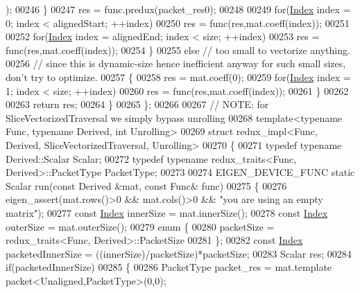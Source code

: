 \begin{DoxyCode}
      );
00246       \}
00247       res = func.predux(packet\_res0);
00248 
00249       \textcolor{keywordflow}{for}(\hyperlink{namespace_eigen_a62e77e0933482dafde8fe197d9a2cfde}{Index} index = 0; index < alignedStart; ++index)
00250         res = func(res,mat.coeff(index));
00251 
00252       \textcolor{keywordflow}{for}(\hyperlink{namespace_eigen_a62e77e0933482dafde8fe197d9a2cfde}{Index} index = alignedEnd; index < size; ++index)
00253         res = func(res,mat.coeff(index));
00254     \}
00255     \textcolor{keywordflow}{else} \textcolor{comment}{// too small to vectorize anything.}
00256          \textcolor{comment}{// since this is dynamic-size hence inefficient anyway for such small sizes, don't try to
       optimize.}
00257     \{
00258       res = mat.coeff(0);
00259       \textcolor{keywordflow}{for}(\hyperlink{namespace_eigen_a62e77e0933482dafde8fe197d9a2cfde}{Index} index = 1; index < size; ++index)
00260         res = func(res,mat.coeff(index));
00261     \}
00262 
00263     \textcolor{keywordflow}{return} res;
00264   \}
00265 \};
00266 
00267 \textcolor{comment}{// NOTE: for SliceVectorizedTraversal we simply bypass unrolling}
00268 \textcolor{keyword}{template}<\textcolor{keyword}{typename} Func, \textcolor{keyword}{typename} Derived, \textcolor{keywordtype}{int} Unrolling>
00269 \textcolor{keyword}{struct }redux\_impl<Func, Derived, SliceVectorizedTraversal, Unrolling>
00270 \{
00271   \textcolor{keyword}{typedef} \textcolor{keyword}{typename} Derived::Scalar Scalar;
00272   \textcolor{keyword}{typedef} \textcolor{keyword}{typename} redux\_traits<Func, Derived>::PacketType PacketType;
00273 
00274   EIGEN\_DEVICE\_FUNC \textcolor{keyword}{static} Scalar run(\textcolor{keyword}{const} Derived &mat, \textcolor{keyword}{const} Func& func)
00275   \{
00276     eigen\_assert(mat.rows()>0 && mat.cols()>0 && \textcolor{stringliteral}{"you are using an empty matrix"});
00277     \textcolor{keyword}{const} \hyperlink{namespace_eigen_a62e77e0933482dafde8fe197d9a2cfde}{Index} innerSize = mat.innerSize();
00278     \textcolor{keyword}{const} \hyperlink{namespace_eigen_a62e77e0933482dafde8fe197d9a2cfde}{Index} outerSize = mat.outerSize();
00279     \textcolor{keyword}{enum} \{
00280       packetSize = redux\_traits<Func, Derived>::PacketSize
00281     \};
00282     \textcolor{keyword}{const} \hyperlink{namespace_eigen_a62e77e0933482dafde8fe197d9a2cfde}{Index} packetedInnerSize = ((innerSize)/packetSize)*packetSize;
00283     Scalar res;
00284     \textcolor{keywordflow}{if}(packetedInnerSize)
00285     \{
00286       PacketType packet\_res = mat.template packet<Unaligned,PacketType>(0,0);

\end{DoxyCode}
